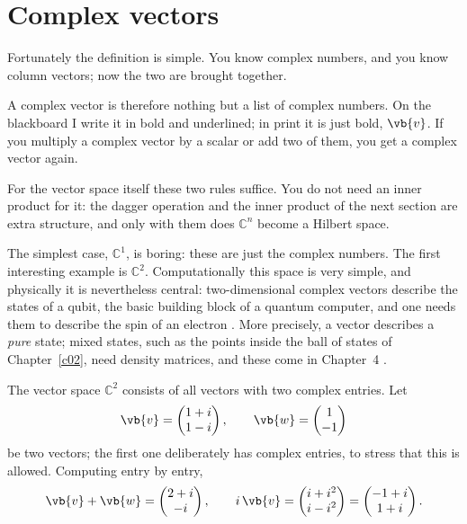 \section{Complex vectors}\label{c03.s1}

Fortunately the definition is simple. You know complex numbers, and you know column vectors;
now the two are brought together.


A complex vector is therefore nothing but a list of complex numbers. On the blackboard I write
it in bold and underlined; in print it is just bold, $\vb{v}$. If you multiply a complex
vector by a scalar or add two of them, you get a complex vector again.

For the vector space itself these two rules suffice. You do not need an inner product for it:
the dagger operation and the inner product of the next section are extra structure, and only
with them does $\mathbb{C}^n$ become a Hilbert space.

The simplest case, $\mathbb{C}^1$, is boring: these are just the complex numbers. The first
interesting example is $\mathbb{C}^2$. Computationally this space is very simple, and
physically it is nevertheless central: two-dimensional complex vectors describe the states of
a qubit, the basic building block of a quantum computer, and one needs them to describe the
spin of an electron . More precisely, a
vector describes a \emph{pure} state; mixed states, such as the points inside the ball of
states of Chapter~\ref{c02}, need density matrices, and these come in Chapter~4
.

\begin{example}\label{c03.ex.c2}
  The vector space $\mathbb{C}^2$ consists of all vectors with two complex entries. Let
  \begin{equation}\label{c03.eq.c2-vektoren}
    \vb{v} = \begin{pmatrix} 1+i \\ 1-i \end{pmatrix},
    \qquad
    \vb{w} = \begin{pmatrix} 1 \\ -1 \end{pmatrix}
  \end{equation}
  be two vectors; the first one deliberately has complex entries, to stress that this is
  allowed. Computing entry by entry,
  \begin{equation}\label{c03.eq.c2-rechnung}
    \vb{v} + \vb{w} = \begin{pmatrix} 2+i \\ -i \end{pmatrix},
    \qquad
    i\,\vb{v} = \begin{pmatrix} i + i^2 \\ i - i^2 \end{pmatrix}
              = \begin{pmatrix} -1+i \\ 1+i \end{pmatrix} .
  \end{equation}
\end{example}

